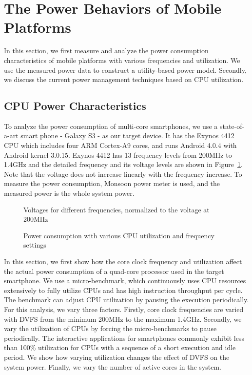 \section{The Power Behaviors of Mobile Platforms}

In this section, we first measure and analyze the power consumption characteristics of mobile platforms with
various frequencies and utilization. We use the measured power data to construct a utility-based power model.
Secondly, we discuss the current power management techniques based on CPU utilization.

\subsection{CPU Power Characteristics}

To analyze the power consumption of multi-core smartphones, we use a state-of-a-art smart phone - Galaxy S3 - as our target device.
It has the Exynos 4412 CPU which includes four ARM Cortex-A9 cores, and runs Android 4.0.4 with Android kernel 3.0.15.
Exynos 4412 has 13 frequency levels from 200MHz to 1.4GHz and the detailed frequency and its voltage levels are shown in
Figure~\ref{fig:voltage}. Note that the voltage does not increase linearly with the frequency increase.
To measure the power consumption, Monsoon power meter is used, and the measured power is 
the whole system power.

\begin{figure}[bt]
\begin{center}
\vspace{-0.2in}
\end{center}
\caption{Voltages for different frequencies, normalized to the voltage at 200MHz}
\label{fig:voltage}
\end{figure}

\begin{figure}[bt]
\begin{center}
\vspace{-0.1in}
\end{center}
\caption{Power consumption with various CPU utilization and frequency settings}
\label{fig:util_power}
\end{figure}

In this section, we first show how the core clock frequency and utilization affect the actual power
consumption of a quad-core processor used in the target smartphone. 
We use a micro-benchmark, which continuously uses CPU resources extensively to fully utilize CPUs and has high instruction
throughput per cycle. The benchmark can adjust CPU utilization by pausing the execution periodically. 
For this analysis, we vary three factors. Firstly, core clock frequencies are varied with DVFS from
the minimum 200MHz to the maximum 1.4GHz. Secondly, we vary the utilization of CPUs by forcing
the micro-benchmarks to pause periodically. The interactive
applications for smartphones commonly exhibit less than 100\% utilization for CPUs with 
a sequence of a short execution and idle period. 
We show how varying utilization changes the effect of DVFS on the system power.
Finally, we vary the number of active cores in the system.

